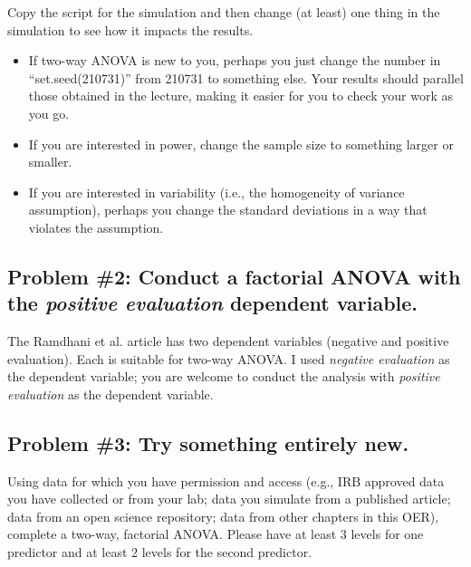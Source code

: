 \documentclass[
  11pt,
]{book}
\providecommand{\tightlist}{%
  \setlength{\itemsep}{0pt}\setlength{\parskip}{0pt}}
\begin{document}
Copy the script for the simulation and then change (at least) one thing in the simulation to see how it impacts the results.

\begin{itemize}
\tightlist
\item
  If two-way ANOVA is new to you, perhaps you just change the number in ``set.seed(210731)'' from 210731 to something else. Your results should parallel those obtained in the lecture, making it easier for you to check your work as you go.
\item
  If you are interested in power, change the sample size to something larger or smaller.
\item
  If you are interested in variability (i.e., the homogeneity of variance assumption), perhaps you change the standard deviations in a way that violates the assumption.
\end{itemize}

\hypertarget{problem-2-conduct-a-factorial-anova-with-the-positive-evaluation-dependent-variable.}{%
\subsection{\texorpdfstring{Problem \#2: Conduct a factorial ANOVA with the \emph{positive evaluation} dependent variable.}{Problem \#2: Conduct a factorial ANOVA with the positive evaluation dependent variable.}}\label{problem-2-conduct-a-factorial-anova-with-the-positive-evaluation-dependent-variable.}}

The Ramdhani et al. \citeyearpar{ramdhani_affective_2018} article has two dependent variables (negative and positive evaluation). Each is suitable for two-way ANOVA. I used \emph{negative evaluation} as the dependent variable; you are welcome to conduct the analysis with \emph{positive evaluation} as the dependent variable.

\hypertarget{problem-3-try-something-entirely-new.-1}{%
\subsection{Problem \#3: Try something entirely new.}\label{problem-3-try-something-entirely-new.-1}}

Using data for which you have permission and access (e.g., IRB approved data you have collected or from your lab; data you simulate from a published article; data from an open science repository; data from other chapters in this OER), complete a two-way, factorial ANOVA. Please have at least 3 levels for one predictor and at least 2 levels for the second predictor.
\end{document}
